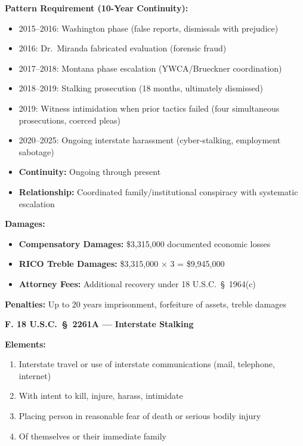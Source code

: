 \documentclass[11pt, letterpaper]{article}
\newcommand{\subsectiontitle}[1]{\vspace{0.15in}\noindent\textcolor{NavyBlue}{\textbf{#1}}\vspace{0.05in}}
\begin{document}
\textbf{Pattern Requirement (10-Year Continuity):}
\begin{itemize}[leftmargin=*,itemsep=2pt]
    \item 2015--2016: Washington phase (false reports, dismissals with prejudice)
    \item 2016: Dr.\ Miranda fabricated evaluation (forensic fraud)
    \item 2017--2018: Montana phase escalation (YWCA/Brueckner coordination)
    \item 2018--2019: Stalking prosecution (18 months, ultimately dismissed)
    \item 2019: Witness intimidation when prior tactics failed (four simultaneous prosecutions, coerced pleas)
    \item 2020--2025: Ongoing interstate harassment (cyber-stalking, employment sabotage)
    \item \textbf{Continuity:} Ongoing through present
    \item \textbf{Relationship:} Coordinated family/institutional conspiracy with systematic escalation
\end{itemize}

\textbf{Damages:}
\begin{itemize}[leftmargin=*,itemsep=2pt]
    \item \textbf{Compensatory Damages:} \$3,315,000 documented economic losses
    \item \textbf{RICO Treble Damages:} \$3,315,000 $\times$ 3 = \$9,945,000
    \item \textbf{Attorney Fees:} Additional recovery under 18 U.S.C.\ \S\ 1964(c)
\end{itemize}

\textbf{Penalties:} Up to 20 years imprisonment, forfeiture of assets, treble damages

\subsectiontitle{F. 18 U.S.C.\ \S\ 2261A --- Interstate Stalking}

\textbf{Elements:}
\begin{enumerate}[leftmargin=*,itemsep=2pt]
    \item Interstate travel or use of interstate communications (mail, telephone, internet)
    \item With intent to kill, injure, harass, intimidate
    \item Placing person in reasonable fear of death or serious bodily injury
    \item Of themselves or their immediate family
\end{enumerate}
\end{document}
